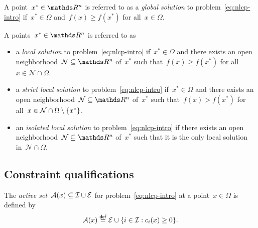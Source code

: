 \begin{definition}
    A point~$x^{\ast} \in \R^n$ is referred to as a \emph{global solution} to problem~\cref{eq:nlcp-intro} if~$x^{\ast} \in \Omega$ and~$f(x) \ge f(x^{\ast})$ for all~$x \in \Omega$.
\end{definition}

\begin{definition}
    A points~$x^{\ast} \in \R^n$ is referred to as
    \begin{itemize}
        \item a \emph{local solution} to problem~\cref{eq:nlcp-intro} if~$x^{\ast} \in \Omega$ and there exists an open neighborhood~$\mathcal{N} \subseteq \R^n$ of~$x^{\ast}$ such that~$f(x) \ge f(x^{\ast})$ for all~$x \in \mathcal{N} \cap \Omega$.
        \item a \emph{strict local solution} to problem~\cref{eq:nlcp-intro} if~$x^{\ast} \in \Omega$ and there exists an open neighborhood~$\mathcal{N} \subseteq \R^n$ of~$x^{\ast}$ such that~$f(x) > f(x^{\ast})$ for all~$x \in \mathcal{N} \cap \Omega \setminus \{x^{\ast}\}$.
        \item an \emph{isolated local solution} to problem~\cref{eq:nlcp-intro} if there exists an open neighborhood~$\mathcal{N} \subseteq \R^n$ of~$x^{\ast}$ such that it is the only local solution in~$\mathcal{N} \cap \Omega$.
    \end{itemize}
\end{definition}

\subsection{Constraint qualifications}

\begin{definition}
    The \emph{active set}~$\mathcal{A}(x) \subseteq \mathcal{I} \cup \mathcal{E}$ for problem~\cref{eq:nlcp-intro} at a point~$x \in \Omega$ is defined by
    \begin{equation*}
        \mathcal{A}(x) \mathrel{\stackrel{\mathsf{def}}{=}} \mathcal{E} \cup \{i \in \mathcal{I} : c_{i}(x) \ge 0\}.
    \end{equation*}
\end{definition}

